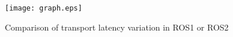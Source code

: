 \documentclass{sig-alternate-ipsn13}
\begin{document}

\begin{figure}[t]
\begin{center}
\texttt{[image: graph.eps]}
\end{center}
\vspace{-8.mm}
\caption{Comparison of transport latency variation in ROS1 or ROS2}
\vspace{-5.0mm}
\label{fig:graph}
\end{figure}



%
\vspace{-3.0mm}



%
%


\end{document}
